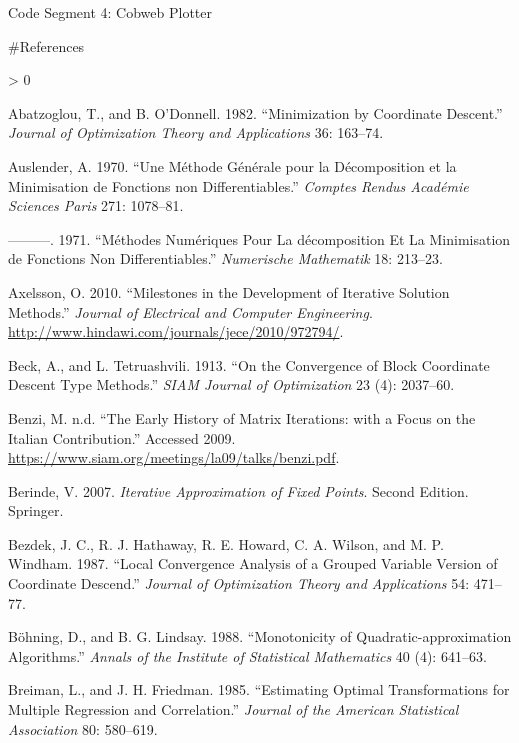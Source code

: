 \documentclass[
  12pt,
]{book}
\newlength{\cslhangindent}
\newenvironment{CSLReferences}[2] %
 {%
  \setlength{\parindent}{0pt}
  \ifodd #1 \everypar{\setlength{\hangindent}{\cslhangindent}}\ignorespaces\fi
  \ifnum #2 > 0
  \setlength{\parskip}{#2\baselineskip}
  \fi
 }%
 {}
\begin{document}
Code Segment 4: Cobweb Plotter

\#References

\hypertarget{refs}{}
\begin{CSLReferences}{1}{0}
\leavevmode\hypertarget{ref-abatzoglou_odonnell_82}{}%
Abatzoglou, T., and B. O'Donnell. 1982. {``{Minimization by Coordinate Descent}.''} \emph{Journal of Optimization Theory and Applications} 36: 163--74.

\leavevmode\hypertarget{ref-auslender_70}{}%
Auslender, A. 1970. {``{Une Méthode Générale pour la Décomposition et la Minimisation de Fonctions non Differentiables}.''} \emph{Comptes Rendus Académie Sciences Paris} 271: 1078--81.

\leavevmode\hypertarget{ref-auslender_71}{}%
---------. 1971. {``{M}éthodes Numériques Pour La décomposition Et La Minimisation de Fonctions Non Differentiables.''} \emph{Numerische Mathematik} 18: 213--23.

\leavevmode\hypertarget{ref-axelsson_10}{}%
Axelsson, O. 2010. {``Milestones in the Development of Iterative Solution Methods.''} \emph{Journal of Electrical and Computer Engineering}. \url{http://www.hindawi.com/journals/jece/2010/972794/}.

\leavevmode\hypertarget{ref-beck_teruashvili_13}{}%
Beck, A., and L. Tetruashvili. 1913. {``{On the Convergence of Block Coordinate Descent Type Methods}.''} \emph{SIAM Journal of Optimization} 23 (4): 2037--60.

\leavevmode\hypertarget{ref-benzi_09}{}%
Benzi, M. n.d. {``{The Early History of Matrix Iterations: with a Focus on the Italian Contribution}.''} Accessed 2009. \url{https://www.siam.org/meetings/la09/talks/benzi.pdf}.

\leavevmode\hypertarget{ref-berinde_07}{}%
Berinde, V. 2007. \emph{Iterative Approximation of Fixed Points}. Second Edition. Springer.

\leavevmode\hypertarget{ref-bezdek_hathaway_howard_wilson_windham_87}{}%
Bezdek, J. C., R. J. Hathaway, R. E. Howard, C. A. Wilson, and M. P. Windham. 1987. {``{Local Convergence Analysis of a Grouped Variable Version of Coordinate Descend}.''} \emph{Journal of Optimization Theory and Applications} 54: 471--77.

\leavevmode\hypertarget{ref-boehning_lindsay_88}{}%
Böhning, D., and B. G. Lindsay. 1988. {``{Monotonicity of Quadratic-approximation Algorithms}.''} \emph{Annals of the Institute of Statistical Mathematics} 40 (4): 641--63.

\leavevmode\hypertarget{ref-breiman_friedman_85}{}%
Breiman, L., and J. H. Friedman. 1985. {``{Estimating Optimal Transformations for Multiple Regression and Correlation}.''} \emph{Journal of the American Statistical Association} 80: 580--619.


\end{CSLReferences}
\end{document}
